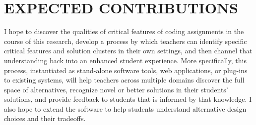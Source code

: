 \documentclass[12pt]{article}
\begin{document}




%
%

\section{EXPECTED CONTRIBUTIONS}

I hope to discover the qualities of critical features of coding assignments in the course of this research, develop a process by which teachers can identify specific critical features and solution clusters in their own settings, and then channel that understanding back into an enhanced student experience. More specifically, this process, instantiated as stand-alone software tools, web applications, or plug-ins to existing systems, will help teachers across multiple domains discover the full space of alternatives, recognize novel or better solutions in their students' solutions, and provide feedback to students that is informed by that knowledge. I also hope to extend the software to help students understand alternative design choices and their tradeoffs.
\end{document}
